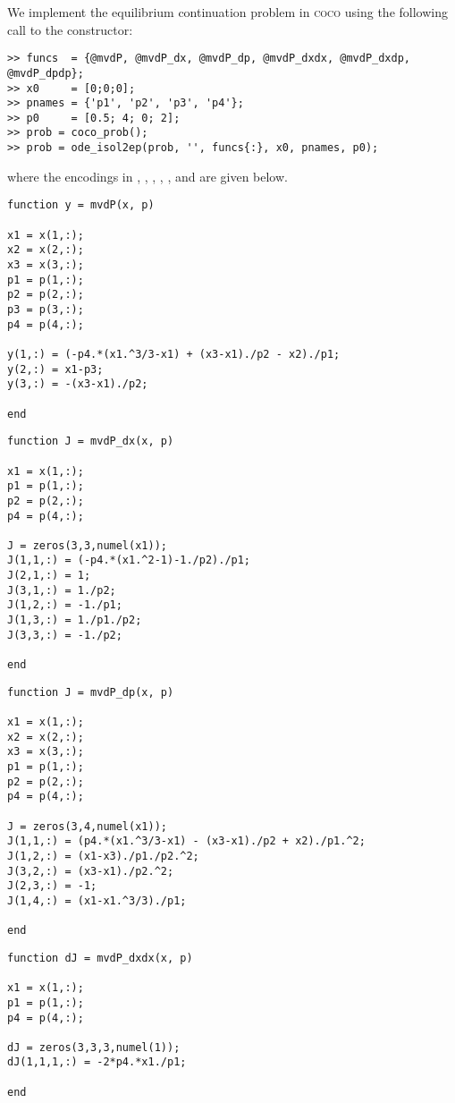We implement the equilibrium continuation problem in \textsc{coco} using the following call to the  constructor:
\begin{lstlisting}[language=coco-highlight]
>> funcs  = {@mvdP, @mvdP_dx, @mvdP_dp, @mvdP_dxdx, @mvdP_dxdp, @mvdP_dpdp};
>> x0     = [0;0;0];
>> pnames = {'p1', 'p2', 'p3', 'p4'};
>> p0     = [0.5; 4; 0; 2];
>> prob = coco_prob();
>> prob = ode_isol2ep(prob, '', funcs{:}, x0, pnames, p0);
\end{lstlisting}
where the encodings in , , , , , and  are given below.
\begin{lstlisting}[language=coco-highlight]
function y = mvdP(x, p)

x1 = x(1,:);
x2 = x(2,:);
x3 = x(3,:);
p1 = p(1,:);
p2 = p(2,:);
p3 = p(3,:);
p4 = p(4,:);

y(1,:) = (-p4.*(x1.^3/3-x1) + (x3-x1)./p2 - x2)./p1;
y(2,:) = x1-p3;
y(3,:) = -(x3-x1)./p2;

end
\end{lstlisting}
\begin{lstlisting}[language=coco-highlight]
function J = mvdP_dx(x, p)

x1 = x(1,:);
p1 = p(1,:);
p2 = p(2,:);
p4 = p(4,:);

J = zeros(3,3,numel(x1));
J(1,1,:) = (-p4.*(x1.^2-1)-1./p2)./p1;
J(2,1,:) = 1;
J(3,1,:) = 1./p2;
J(1,2,:) = -1./p1;
J(1,3,:) = 1./p1./p2;
J(3,3,:) = -1./p2;

end
\end{lstlisting}
\begin{lstlisting}[language=coco-highlight]
function J = mvdP_dp(x, p)

x1 = x(1,:);
x2 = x(2,:);
x3 = x(3,:);
p1 = p(1,:);
p2 = p(2,:);
p4 = p(4,:);

J = zeros(3,4,numel(x1));
J(1,1,:) = (p4.*(x1.^3/3-x1) - (x3-x1)./p2 + x2)./p1.^2;
J(1,2,:) = (x1-x3)./p1./p2.^2;
J(3,2,:) = (x3-x1)./p2.^2;
J(2,3,:) = -1;
J(1,4,:) = (x1-x1.^3/3)./p1;

end
\end{lstlisting}
\begin{lstlisting}[language=coco-highlight]
function dJ = mvdP_dxdx(x, p)

x1 = x(1,:);
p1 = p(1,:);
p4 = p(4,:);

dJ = zeros(3,3,3,numel(1));
dJ(1,1,1,:) = -2*p4.*x1./p1;

end
\end{lstlisting}
